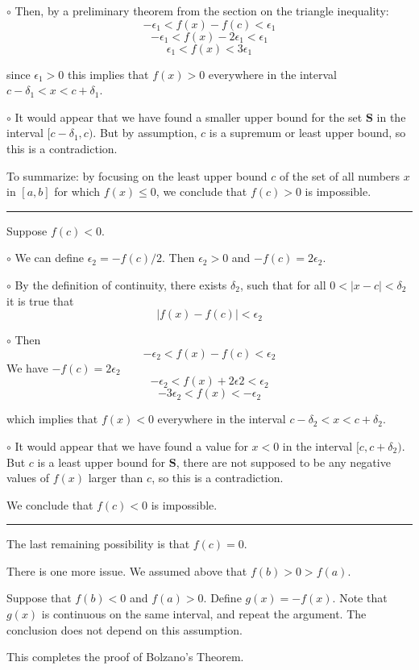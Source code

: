 \documentclass[11pt, oneside]{article}
\begin{document}
$\circ$  Then, by a preliminary theorem from the section on the triangle inequality:
\[ -\epsilon_1 < f(x) - f(c) < \epsilon_1 \]
\[ -\epsilon_1 < f(x) - 2 \epsilon_1 < \epsilon_1 \]
\[ \epsilon_1 < f(x) < 3 \epsilon_1 \]

since $\epsilon_1 > 0$ this implies that $f(x) > 0$ everywhere in the interval $c - \delta_1 < x < c + \delta_1$.

$\circ$  It would appear that we have found a smaller upper bound for the set $\mathbf{S}$ in the interval $[c - \delta_1,c)$.  But by assumption, $c$ is a supremum or least upper bound, so this is a contradiction.

To summarize:  by focusing on the least upper bound $c$ of the set of all numbers $x$ in $[a,b]$ for which $f(x) \le 0$, we conclude that $f(c) > 0$ is impossible.

\noindent\rule{2cm}{0.4pt}

Suppose $f(c) < 0$.

$\circ$  We can define $\epsilon_2 = -f(c)/2$.  Then $\epsilon_2 > 0$ and $-f(c) = 2 \epsilon_2$.

$\circ$  By the definition of continuity, there exists $\delta_2$, such that for all $0 < |x - c| < \delta_2$ it is true that
\[ |f(x) - f(c)| < \epsilon_2 \]

$\circ$  Then
\[ -\epsilon_2 < f(x) - f(c) < \epsilon_2 \]
We have $-f(c) = 2 \epsilon_2$
\[ -\epsilon_2 < f(x) + 2 \epsilon2 < \epsilon_2 \]
\[ -3\epsilon_2 < f(x) < -\epsilon_2 \]

which implies that $f(x) < 0$ everywhere in the interval $c - \delta_2 < x < c + \delta_2$.

$\circ$  It would appear that we have found a value for $x < 0$ in the interval $[c, c + \delta_2)$.  But $c$ is a least upper bound for $\mathbf{S}$, there are not supposed to be any negative values of $f(x)$ larger than $c$, so this is a contradiction.  

We conclude that $f(c) < 0$ is impossible.

\noindent\rule{2cm}{0.4pt}

The last remaining possibility is that $f(c) = 0$.

There is one more issue.  We assumed above that $f(b) > 0 > f(a)$.

Suppose that $f(b) < 0$ and $f(a) > 0$.  Define $g(x) = -f(x)$.  Note that $g(x)$ is continuous on the same interval, and repeat the argument.  The conclusion does not depend on this assumption.

This completes the proof of Bolzano's Theorem.
\end{document}
